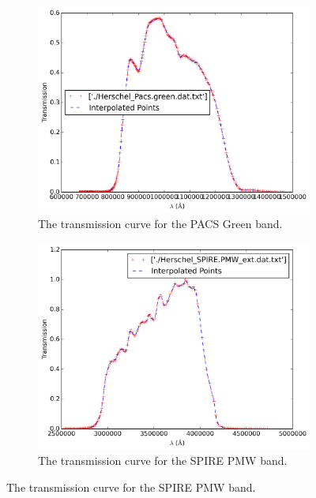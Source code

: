 \documentclass{report}
\begin{document}
\begin{figure}
\begin{subfigure}[b]{.45\linewidth}
\includegraphics[width=\linewidth]{../img/interpolated_green.png}
\caption{The transmission curve for the PACS Green band.}\label{fig:green}
\end{subfigure}
\begin{subfigure}[b]{.45\linewidth}
\includegraphics[width=\linewidth]{../img/interpolated_pmw.png}
\caption{The transmission curve for the SPIRE PMW band.}\label{fig:pmw}
\end{subfigure}


\end{figure}
\end{document}
